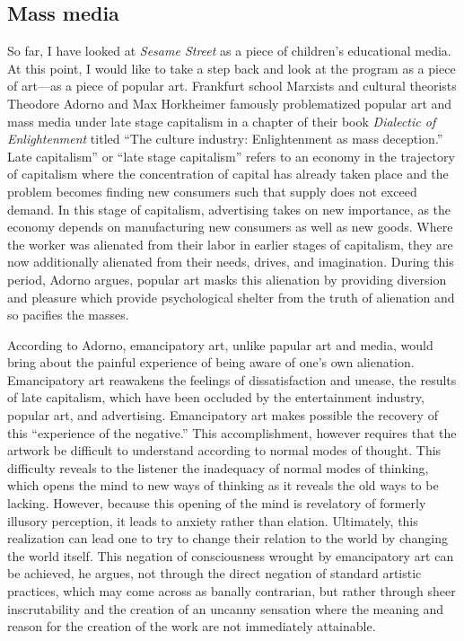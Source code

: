 \documentclass[12pt,letterpaper]{article}
\newcommand{\ses}{\textit{Sesame Street }}
\begin{document}
	\subsection*{Mass media}

	So far, I have looked at \ses as a piece of 
	children's educational media. At this point, I would like to take 
	a step back and look at the program as a piece of art---as a piece of
	popular art. Frankfurt school Marxists and cultural theorists Theodore 
	Adorno and Max Horkheimer famously problematized popular art and mass 
	media under late stage capitalism in a chapter of their book 
	\textit{Dialectic of Enlightenment} titled ``The culture industry: 
	Enlightenment as mass deception.''\autocite{Adorno} Late capitalism'' 
	or ``late stage capitalism'' 
	refers to an economy in the trajectory of capitalism where the 
	concentration of capital has already taken place and the problem 
	becomes finding new consumers such that supply does not exceed demand. 
	In this stage of capitalism, advertising takes on new importance, as
	the economy depends on manufacturing new consumers as well as new 
	goods.\autocite[66]{Baugh}
	Where the worker was alienated from their labor in earlier stages of 
	capitalism, they are now additionally
	alienated from their needs, drives, and imagination.\autocite[66]{Baugh}
	During this period, Adorno argues, popular art masks this alienation 
	by providing diversion and pleasure which provide psychological shelter
	from the truth of alienation and so pacifies the
	masses.\autocite[67]{Baugh}

	According to Adorno, emancipatory art, unlike papular art and media, 
	would bring about the painful experience of being aware of one's own 
	alienation. Emancipatory art reawakens the feelings of dissatisfaction 
	and unease, the results of late capitalism, which have been occluded by
	the entertainment industry, popular art, and advertising. Emancipatory 
	art makes possible the recovery of this ``experience of the negative.''
	This accomplishment, however requires that the artwork be difficult to 
	understand according to normal modes of thought. This difficulty reveals
	to the listener the inadequacy of normal modes of thinking, which opens 
	the mind to new ways of thinking as it reveals the old ways to be 
	lacking. However, because this opening of the mind is revelatory of 
	formerly illusory perception, it leads to anxiety rather than elation. 
	Ultimately, this realization can lead one to try to change their 
	relation to the world by changing the world 
	itself.\autocite[67--69]{Baugh}    
	This negation of consciousness wrought by emancipatory art can be 
	achieved, he argues, not through the direct negation of standard 
	artistic practices, which may come across as banally contrarian, but 
	rather through sheer inscrutability and the creation of an uncanny 
	sensation where the meaning and reason for the creation of the work are
	not immediately attainable.\autocite[71]{Baugh}
	
\end{document}
